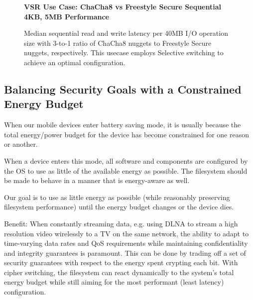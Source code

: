 \begin{figure}[ht] \textbf{VSR Use Case: ChaCha8 vs Freestyle Secure Sequential
4KB, 5MB Performance}\par\medskip
   \centering
   {} \caption{Median sequential read and
   write latency per 40MB I/O operation size with 3-to-1 ratio of ChaCha8
   nuggets to Freestyle Secure nuggets, respectively. This usecase employs
   Selective switching to achieve an optimal configuration.}
  \label{fig:usecase-vsr-bar}
\end{figure}


\subsection{Balancing Security Goals with a Constrained Energy Budget}

When our mobile devices enter battery saving mode, it is usually because the
total energy/power budget for the device has become constrained for one reason
or another.

When a device enters this mode, all software and components are configured by
the OS to use as little of the available energy as possible. The filesystem
should be made to behave in a manner that is energy-aware as well.

Our goal is to use as little energy as possible (while reasonably preserving
filesystem performance) until the energy budget changes or the device dies.

Benefit: When constantly streaming data, e.g. using DLNA to stream a high
resolution video wirelessly to a TV on the same network, the ability to adapt to
time-varying data rates and QoS requirements while maintaining confidentiality
and integrity guarantees is paramount. This can be done by trading off a set of
security guarantees with respect to the energy spent crypting each bit. With
cipher switching, the filesystem can react dynamically to the system's total
energy budget while still aiming for the most performant (least latency)
configuration.


